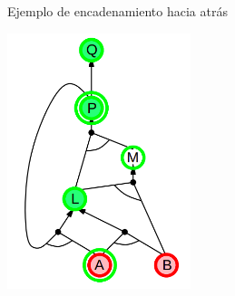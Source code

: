 \begin{frame}{Ejemplo de encadenamiento hacia atr\'as}
    
    \centering
    \includegraphics[width=0.4\textwidth]{58_images_bce.png}
    
\end{frame}
